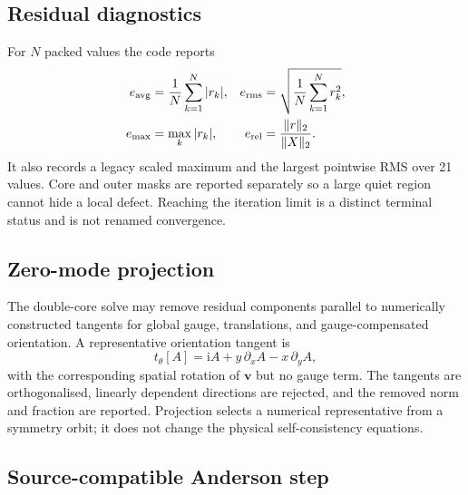 \documentclass[11pt,a4paper]{article}
\newcommand{\ii}{\mathrm{i}}
\begin{document}
\subsection{Residual diagnostics}

For $N$ packed values the code reports
\begin{align}
  e_{\rm avg}&=\frac1N\sum_{k=1}^{N}|r_k|,&
  e_{\rm rms}&=\sqrt{\frac1N\sum_{k=1}^{N}r_k^2},\\
  e_{\max}&=\max_k|r_k|,&
  e_{\rm rel}&=\frac{\|r\|_2}{\|X\|_2}.
  \label{eq:residuals}
\end{align}
It also records a legacy scaled maximum and the largest pointwise RMS over 21
values.  Core and outer masks are reported separately so a large quiet region
cannot hide a local defect.  Reaching the iteration limit is a distinct
terminal status and is not renamed convergence.

\subsection{Zero-mode projection}

The double-core solve may remove residual components parallel to numerically
constructed tangents for global gauge, translations, and gauge-compensated
orientation.  A representative orientation tangent is
\begin{equation}
  t_\theta[A]=\ii A+y\,\partial_x A-x\,\partial_y A,
  \label{eq:orientation-tangent}
\end{equation}
with the corresponding spatial rotation of $\bm v$ but no gauge term.  The
tangents are orthogonalised, linearly dependent directions are rejected, and
the removed norm and fraction are reported.  Projection selects a numerical
representative from a symmetry orbit; it does not change the physical
self-consistency equations.

\subsection{Source-compatible Anderson step}
\end{document}
